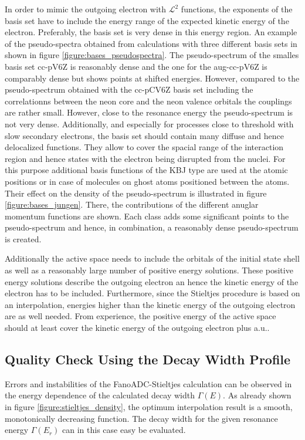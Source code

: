 In order to mimic the outgoing electron with $\mathcal{L}^2$ functions, the
exponents of the basis set have to include the energy range of the expected
kinetic energy of the electron. Preferably, the basis set is very dense in
this energy region. 
An example of the pseudo-spectra obtained from calculations with three
different basis sets in shown in figure \ref{figure:bases_pseudospectra}.
The pseudo-spectrum of the smalles basis set cc-pV6Z is reasonably dense and
the one for the aug-cc-pV6Z is comparably dense but shows points at shifted
energies. However, compared to the pseudo-spectrum obtained with the cc-pCV6Z
basis set including the correlationns between the neon core and the neon valence
orbitals the couplings are rather small. However, close to the resonance energy
the pseudo-spectrum is not very dense.
Additionally, and especially for processes close to threshold     
with slow                                                               
secondary electrons, the basis set should contain many diffuse and hence
delocalized functions.
They allow to cover the spacial range of the interaction
region and hence states with the electron being disrupted from the nuclei.
For this purpose additional basis functions of the \ac{KBJ}\cite{Kaufmann89}
type are used at the atomic positions or in case of molecules on ghost atoms
positioned between the atoms. Their effect on the density of the pseudo-spectrum
is illustrated in figure \ref{figure:bases_jungen}. There, the contributions of the
different anuglar momentum functions are shown. Each class adds some significant
points to the pseudo-spectrum and hence, in combination, a reasonably dense
pseudo-spectrum is created.

Additionally the active space needs to include the orbitals of the initial state
shell as well as a reasonably large number of positive energy solutions. These
positive energy solutions describe the outgoing electron an hence the kinetic energy
of the electron has to be included. Furthermore, since the Stieltjes procedure is
based on an interpolation, energies higher than the kinetic energy of the outgoing
electron are as well needed. From experience, the positive energy of the active
space should at least cover the kinetic energy of the outgoing electron plus
\unit[10]{a.u.}.



\subsection{Quality Check Using the Decay Width Profile}
\label{section:Stieltjes_profile_properties}
Errors and instabilities of the FanoADC-Stieltjes calculation can be observed
in the energy dependence of the calculated decay width $\Gamma(E)$.
As already shown in figure \ref{figure:stieltjes_density}, the optimum
interpolation result is a smooth, monotonically decreasing function.
The decay width for the given resonance energy $\Gamma(E_r)$ can in this case easy be
evaluated.

